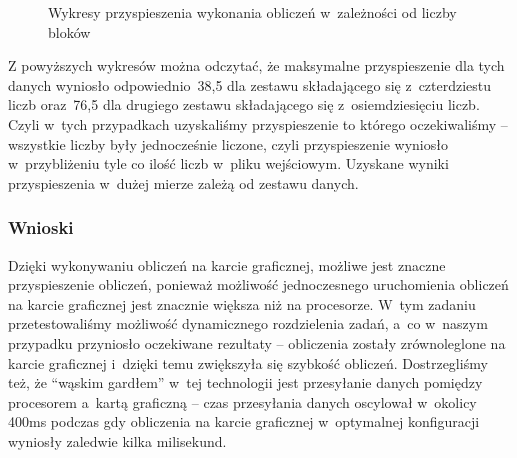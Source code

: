 \documentclass[a4paper,12pt]{article}
\begin{document}
\begin{figure}[!hbp]
\begin{center}
  \caption{Wykresy przyspieszenia wykonania obliczeń w~zależności od liczby bloków}
\end{center}
\end{figure}
Z powyższych wykresów można odczytać, że maksymalne przyspieszenie dla tych danych wyniosło odpowiednio~38,5 dla zestawu składającego się z~czterdziestu liczb oraz~76,5 dla drugiego zestawu składającego się z~osiemdziesięciu liczb. Czyli w~tych przypadkach uzyskaliśmy przyspieszenie to którego oczekiwaliśmy -- wszystkie liczby były jednocześnie liczone, czyli przyspieszenie wyniosło w~przybliżeniu tyle co ilość liczb w~pliku wejściowym. Uzyskane wyniki przyspieszenia w~dużej mierze zależą od zestawu danych.

\subsubsection*{Wnioski}
\noindent Dzięki wykonywaniu obliczeń na karcie graficznej, możliwe jest znaczne przyspieszenie obliczeń, ponieważ możliwość jednoczesnego uruchomienia obliczeń na karcie graficznej jest znacznie większa niż na procesorze. W~tym zadaniu przetestowaliśmy możliwość dynamicznego rozdzielenia zadań, a~co w~naszym przypadku przyniosło oczekiwane rezultaty -- obliczenia zostały zrównoleglone na karcie graficznej i~dzięki temu zwiększyła się szybkość obliczeń. Dostrzegliśmy też, że ``wąskim gardłem'' w~tej technologii jest przesyłanie danych pomiędzy procesorem a~kartą graficzną -- czas przesyłania danych oscylował w~okolicy 400ms podczas gdy obliczenia na karcie graficznej w~optymalnej konfiguracji wyniosły zaledwie kilka milisekund.
\end{document}
